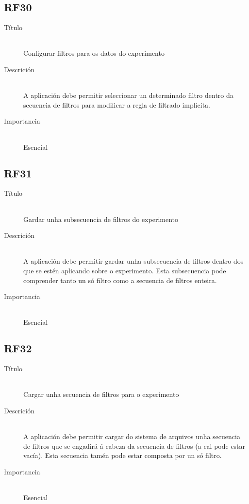 \subsection*{RF30}
\begin{description}
\item[Título] \hfill \\
Configurar filtros para os datos do experimento
\item[Descrición] \hfill \\
A aplicación debe permitir seleccionar un determinado filtro dentro da secuencia de filtros para modificar a regla de filtrado implícita.
\item[Importancia] \hfill \\
Esencial
\end{description}

\subsection*{RF31}
\begin{description}
\item[Título] \hfill \\
Gardar unha subsecuencia de filtros do experimento
\item[Descrición] \hfill \\
A aplicación debe permitir gardar unha subsecuencia de filtros dentro dos que se estén aplicando sobre o experimento. Esta subsecuencia pode comprender tanto un só filtro como a secuencia de filtros enteira.
\item[Importancia] \hfill \\
Esencial
\end{description}

\subsection*{RF32}
\begin{description}
\item[Título] \hfill \\
Cargar unha secuencia de filtros para o experimento
\item[Descrición] \hfill \\
A aplicación debe permitir cargar do sistema de arquivos unha secuencia de filtros que se engadirá á cabeza da secuencia de filtros (a cal pode estar vacía). Esta secuencia tamén pode estar composta por un só filtro.
\item[Importancia] \hfill \\
Esencial
\end{description}


